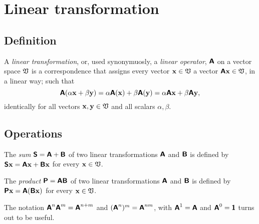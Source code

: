 \section{Linear transformation}

\subsection{Definition}
A {\em linear transformation}, or, used synonymuosly, a {\em linear operator},
$\textsf{\textbf{A}} $ on a vector space ${\frak V}$ is a correspondence that assigns every vector
${\bf x}\in {\frak V}$ a vector $\textsf{\textbf{A}} {\bf x}\in {\frak V}$,
in a linear way; such  that
\begin{equation}
\textsf{\textbf{A}}  (\alpha {\bf x}+ \beta {\bf y}) = \alpha \textsf{\textbf{A}}({\bf x})
+  \beta \textsf{\textbf{A}} ({\bf y}) = \alpha \textsf{\textbf{A}}{\bf x}
+  \beta \textsf{\textbf{A}} {\bf y},
\end{equation}
identically for all vectors ${\bf x},{\bf y}\in {\frak V}$ and all scalars $\alpha , \beta$.


\subsection{Operations}
The {\em sum}
$\textsf{\textbf{S}} =\textsf{\textbf{A}} +\textsf{\textbf{B}} $
of two linear transformations $\textsf{\textbf{A}}$ and $\textsf{\textbf{B}} $
is defined by
$\textsf{\textbf{S}} {\bf x}=\textsf{\textbf{A}}{\bf x} +\textsf{\textbf{B}} {\bf x}$
for every ${\bf x}\in {\frak V}$.

The {\em product}
$\textsf{\textbf{P}} =\textsf{\textbf{A}} \textsf{\textbf{B}} $
of two linear transformations $\textsf{\textbf{A}}$ and $\textsf{\textbf{B}} $
is defined by
$\textsf{\textbf{P}} {\bf x}=\textsf{\textbf{A}}(\textsf{\textbf{B}} {\bf x})$
for every ${\bf x}\in {\frak V}$.

The notation
$\textsf{\textbf{A}}^n\textsf{\textbf{A}}^m=\textsf{\textbf{A}}^{n+m}$
and $(\textsf{\textbf{A}}^n)^m= \textsf{\textbf{A}}^{nm}$,
with $\textsf{\textbf{A}}^1=\textsf{\textbf{A}}$ and
$\textsf{\textbf{A}}^0 =\textsf{\textbf{1}}$ turns out to be useful.

